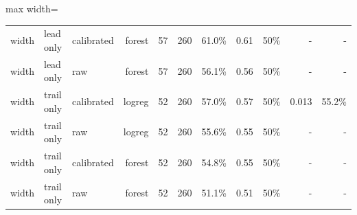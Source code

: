\begin{adjustbox}{max width=\textwidth}
{\begin{tabular}{lllrrrrrrrr}
width & lead only & calibrated & forest & 57 & 260 & 61.0\% & 0.61 & 50\% & - & - \\
width & lead only & raw & forest & 57 & 260 & 56.1\% & 0.56 & 50\% & - & - \\
width & trail only & calibrated & logreg & 52 & 260 & 57.0\% & 0.57 & 50\% & 0.013 & 55.2\% \\
width & trail only & raw & logreg & 52 & 260 & 55.6\% & 0.55 & 50\% & - & - \\
width & trail only & calibrated & forest & 52 & 260 & 54.8\% & 0.55 & 50\% & - & - \\
width & trail only & raw & forest & 52 & 260 & 51.1\% & 0.51 & 50\% & - & - \\
\bottomrule
\end{tabular}
}
\end{adjustbox}
